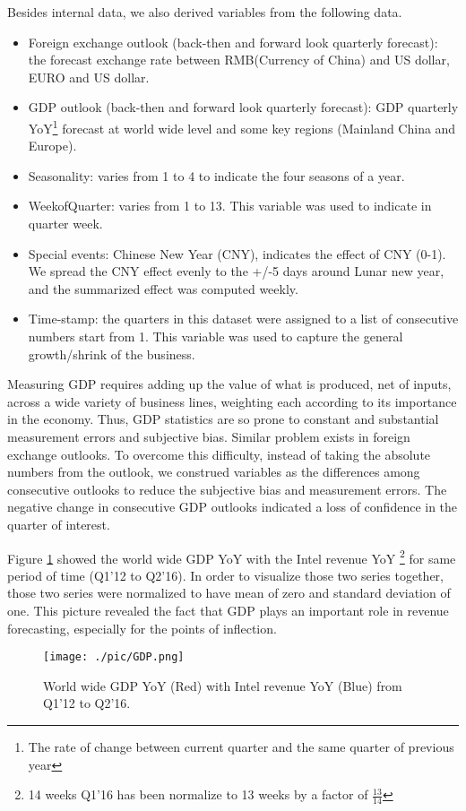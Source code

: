\documentclass{llncs}
\begin{document}
Besides internal data, we also derived variables from the following data.
\begin{itemize}
\item Foreign exchange outlook (back-then and forward look quarterly forecast): the forecast exchange rate between RMB(Currency of China) and US dollar, EURO and US dollar. 
\item GDP outlook (back-then and forward look quarterly forecast): GDP quarterly YoY\footnote{The rate of change between current quarter and the same quarter of previous year} forecast at world wide level and some key regions (Mainland China and Europe).
\item Seasonality: varies from 1 to 4 to indicate the four seasons of a year.
\item WeekofQuarter: varies from 1 to 13. This variable was used to indicate in quarter week. 
\item Special events: Chinese New Year (CNY), indicates the effect of CNY (0-1). We spread the CNY effect evenly to the +/-5 days around Lunar new year, and the summarized effect was computed weekly. 
\item Time-stamp: the quarters in this dataset were assigned to a list of consecutive numbers start from 1. This variable was used to capture the general growth/shrink of the business. 
\end{itemize}

Measuring GDP requires adding up the value of what is produced, net of inputs, across a wide variety of business lines, weighting each according to its importance in the economy. Thus, GDP statistics are so prone to constant and substantial measurement errors and subjective bias. Similar problem exists in foreign exchange outlooks. To overcome this difficulty, instead of taking the absolute numbers from the outlook, we construed variables as the differences among consecutive outlooks to reduce the subjective bias and measurement errors. The negative change in consecutive GDP outlooks indicated a loss of confidence in the quarter of interest. 

Figure \ref{fig:variable2} showed the world wide GDP YoY with the Intel revenue YoY \footnote{14 weeks Q1'16 has been normalize to 13 weeks by a factor of $\frac{13}{14}$} for same period of time (Q1'12 to Q2'16). In order to visualize those two series together, those two series were normalized to have mean of zero and standard deviation of one. This picture revealed the fact that GDP plays an important role in revenue forecasting, especially for the points of inflection.
\begin{figure}[ht]
	\centering 
    \texttt{[image: ./pic/GDP.png]}
    \caption{World wide GDP YoY (Red) with Intel revenue YoY (Blue) from Q1'12 to Q2'16.}
    \label{fig:variable2}
\end{figure}
\end{document}
